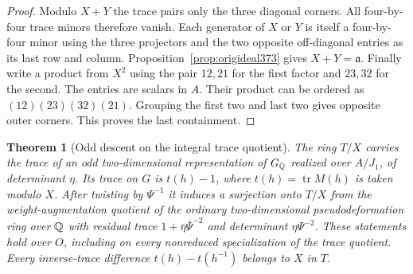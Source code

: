 \documentclass[a4paper,11pt]{article}
\newtheorem{theorem}[proposition]{Theorem}
\theoremstyle{definition}
\theoremstyle{remark}
\numberwithin{equation}{section}
\begin{document}
\begin{proof}
Modulo \(X+Y\) the trace pairs only the three diagonal corners.
All four-by-four trace minors therefore vanish. Each generator
of \(X\) or \(Y\) is itself a four-by-four minor using the
three projectors and the two opposite off-diagonal entries
as its last row and column. Proposition~\ref{prop:origideal373}
gives \(X+Y=\mathfrak a\). Finally write a product from
\(X^2\) using the pair \(12,21\) for the first factor and
\(23,32\) for the second. The entries are scalars in \(A\).
Their product can be ordered as \((12)(23)(32)(21)\).
Grouping the first two and last two gives opposite outer
corners. This proves the last containment.
\end{proof}

\begin{theorem}[Odd descent on the integral trace quotient]
\label{thm:planedesc381}
The ring \(T/X\) carries the trace of an odd two-dimensional
representation of \(G_\mathbb Q\) realized over \(A/J_1\), of
determinant \(\eta\). Its trace on \(G\) is \(t(h)-1\), where
\(t(h)=\operatorname{tr}M(h)\) is taken modulo \(X\).
After twisting by \(\Psi^{-1}\) it induces a surjection onto
\(T/X\) from the weight-augmentation quotient of the ordinary
two-dimensional pseudodeformation ring over \(\mathbb Q\) with
residual trace \(1+\bar\eta\bar\Psi^{-2}\) and determinant
\(\eta\Psi^{-2}\). These statements hold over \(O\), including
on every nonreduced specialization of the trace quotient.
Every inverse-trace difference \(t(h)-t(h^{-1})\) belongs to
\(X\) in \(T\).
\end{theorem}
\end{document}
